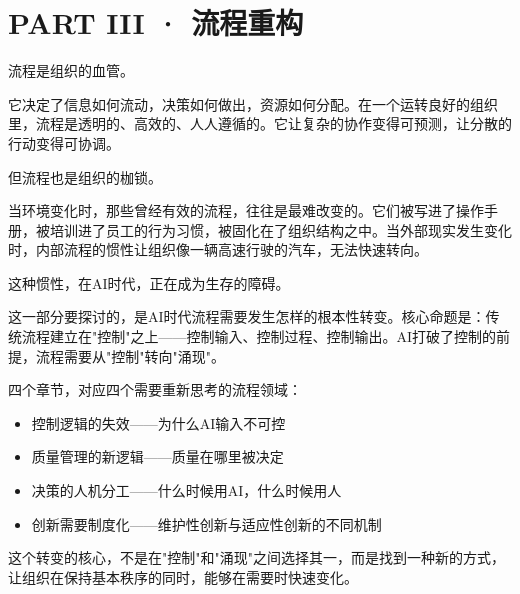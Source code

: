 \part{PART III · 流程重构}



流程是组织的血管。

它决定了信息如何流动，决策如何做出，资源如何分配。在一个运转良好的组织里，流程是透明的、高效的、人人遵循的。它让复杂的协作变得可预测，让分散的行动变得可协调。

但流程也是组织的枷锁。

当环境变化时，那些曾经有效的流程，往往是最难改变的。它们被写进了操作手册，被培训进了员工的行为习惯，被固化在了组织结构之中。当外部现实发生变化时，内部流程的惯性让组织像一辆高速行驶的汽车，无法快速转向。

这种惯性，在AI时代，正在成为生存的障碍。

这一部分要探讨的，是AI时代流程需要发生怎样的根本性转变。核心命题是：传统流程建立在"控制"之上——控制输入、控制过程、控制输出。AI打破了控制的前提，流程需要从"控制"转向"涌现"。

四个章节，对应四个需要重新思考的流程领域：
\begin{itemize}
\item 控制逻辑的失效——为什么AI输入不可控
\item 质量管理的新逻辑——质量在哪里被决定
\item 决策的人机分工——什么时候用AI，什么时候用人
\item 创新需要制度化——维护性创新与适应性创新的不同机制

\end{itemize}
这个转变的核心，不是在"控制"和"涌现"之间选择其一，而是找到一种新的方式，让组织在保持基本秩序的同时，能够在需要时快速变化。
